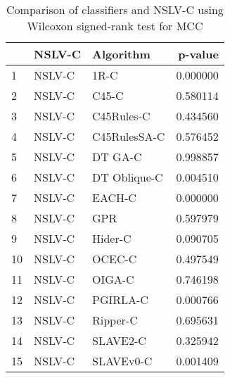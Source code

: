 \begin{table}
\footnotesize
\caption{Comparison of classifiers and NSLV-C using Wilcoxon signed-rank test for MCC}
\label{tab:NSLV-C wilcoxon MCC comparison}
\begin{tabular}{lllr}
\hline
 & NSLV-C & Algorithm & p-value \\
\hline
1 & NSLV-C & 1R-C & 0.000000 \\
2 & NSLV-C & C45-C & 0.580114 \\
3 & NSLV-C & C45Rules-C & 0.434560 \\
4 & NSLV-C & C45RulesSA-C & 0.576452 \\
5 & NSLV-C & DT GA-C & 0.998857 \\
6 & NSLV-C & DT Oblique-C & 0.004510 \\
7 & NSLV-C & EACH-C & 0.000000 \\
8 & NSLV-C & GPR & 0.597979 \\
9 & NSLV-C & Hider-C & 0.090705 \\
10 & NSLV-C & OCEC-C & 0.497549 \\
11 & NSLV-C & OIGA-C & 0.746198 \\
12 & NSLV-C & PGIRLA-C & 0.000766 \\
13 & NSLV-C & Ripper-C & 0.695631 \\
14 & NSLV-C & SLAVE2-C & 0.325942 \\
15 & NSLV-C & SLAVEv0-C & 0.001409 \\
\hline
\end{tabular}
\end{table}

